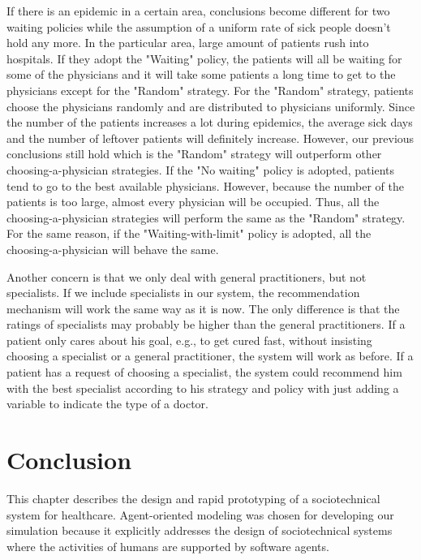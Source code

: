 If there is an epidemic in a certain area, conclusions become different for two waiting policies while the assumption of a uniform rate of sick people doesn't hold any more. In the particular area, large amount of patients rush into hospitals. If they adopt the "Waiting" policy, the patients will all be waiting for some of the physicians and it will take some patients a long time to get to the physicians except for the "Random" strategy. For the "Random" strategy, patients choose the physicians randomly and are distributed to physicians uniformly. Since the number of the patients increases a lot during epidemics, the average sick days and the number of leftover patients will definitely increase. However, our previous conclusions still hold which is the "Random" strategy will outperform other choosing-a-physician strategies. If the "No waiting" policy is adopted, patients tend to go to the best available physicians. However, because the number of the patients is too large, almost every physician will be occupied. Thus, all the choosing-a-physician strategies will perform the same as the "Random" strategy. For the same reason, if the "Waiting-with-limit" policy is adopted, all the choosing-a-physician will behave the same.

Another concern is that we only deal with general practitioners, but not specialists. If we include specialists in our system, the recommendation mechanism will work the same way as it is now. The only difference is that the ratings of specialists may probably be higher than the general practitioners. If a patient only cares about his goal, e.g., to get cured fast, without insisting choosing a specialist or a general practitioner, the system will work as before. If a patient has a request of choosing a specialist, the system could recommend him with the best specialist according to his strategy and policy with just adding a variable to indicate the type of a doctor. 
      

\section{Conclusion}
This chapter describes the design and rapid prototyping of a sociotechnical system for healthcare. Agent-oriented modeling was chosen for developing our simulation because it explicitly addresses the design of sociotechnical systems where the activities of humans are supported by software agents.

